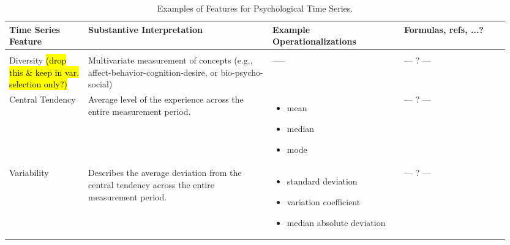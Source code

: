 \begin{sidewaystable}
    \centering
    \caption{Examples of Features for Psychological Time Series.}
    \label{tab:esmFeatures} 
    \begin{tabular}{
    >{\raggedright\arraybackslash}p{0.15\linewidth} 
    >{\raggedright\arraybackslash}p{0.35\linewidth} 
    >{\raggedright\arraybackslash}p{0.25\linewidth} 
    >{\raggedright\arraybackslash}p{0.20\linewidth}
    }
        \hline 
        Time Series Feature & Substantive Interpretation & Example Operationalizations & Formulas, refs, ...? \\ 
        \hline \\ [-0.5em]
        Diversity \newline \hl{(drop this \& keep in var. selection only?)} & 
        Multivariate measurement of concepts (e.g., affect-behavior-cognition-desire, or bio-psycho-social) \linebreak & 
        -----\linebreak  & 
        {\centering --- ? ---\par} \\
        
        Central Tendency \linebreak & 
        Average level of the experience across the entire measurement period. \linebreak & 
        \vspace{-1em}
        \begin{itemize}[nosep,leftmargin=*,label={--}]
            \item mean
            \item median
            \item mode
        \end{itemize} \linebreak  & 
        {\centering --- ? ---\par} \\ 
        
        Variability & 
        Describes the average deviation from the central tendency across the entire measurement period. \linebreak & 
        \vspace{-1em}
        \begin{itemize}[nosep,leftmargin=*,label={--}]
            \item standard deviation
            \item variation coefficient
            \item median absolute deviation
        \end{itemize} \linebreak & 
        {\centering --- ? ---\par} \\ 
        

\end{tabular}
\end{sidewaystable}
